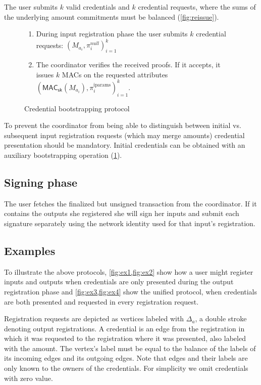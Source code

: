 \documentclass[a4paper]{article}
\begin{document}
The user submits $k$ valid credentials and $k$ credential requests, where the sums of the underlying amount commitments must be balanced (\cref{fig:reissue}).

\begin{figure}[h!]
  \begin{mdframed}
    \begin{enumerate}
    \item During input registration phase the user submits $k$ credential requests:  $(M_{a_i},\pi^{\mathit{null}}_{i})^{k}_{i=1}$
    \item The coordinator verifies the received proofs. If it accepts, it issues $k$ MACs on the requested attributes $(\mathsf{MAC}_\mathsf{sk}(M_{a_i}), \pi_i^{\mathrm{iparams}})^{k}_{i=1}$.
    \end{enumerate}
  \end{mdframed}
  \caption{Credential bootstrapping protocol}
  \label{fig:bootstrap}
\end{figure}

To prevent the coordinator from being able to distinguish between initial vs. subsequent input registration requests (which may merge amounts) credential presentation should be mandatory. Initial credentials can be obtained with an auxiliary bootstrapping operation (\cref{fig:bootstrap}).

\subsection{Signing phase}

The user fetches the finalized but unsigned transaction from the coordinator. If it contains the outputs she registered she will sign her inputs and submit each signature separately using the network identity used for that input's registration.

\subsection{Examples}\label{sec:examples}


To illustrate the above protocols, \cref{fig:ex1,fig:ex2} show how a user might register inputs and outputs when credentials are only presented during the output registration phase and \cref{fig:ex3,fig:ex4} show the unified protocol, when credentials are both presented and requested in every registration request.

Registration requests are depicted as vertices labeled with $\Delta_a$, a double stroke denoting output registrations. A credential is an edge from the registration in which it was requested to the registration where it was presented, also labeled with the amount. The vertex's label must be equal to the balance of the labels of its incoming edges and its outgoing edges. Note that edges and their labels are only known to the owners of the credentials. For simplicity we omit credentials with zero value.
\end{document}
